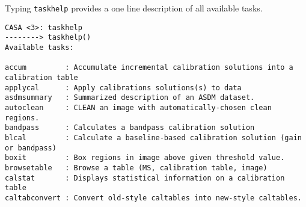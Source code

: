 Typing {\tt taskhelp} provides a one line description of all available
tasks.
\small
\begin{verbatim}
CASA <3>: taskhelp
--------> taskhelp()
Available tasks: 

accum         : Accumulate incremental calibration solutions into a calibration table
applycal      : Apply calibrations solutions(s) to data
asdmsummary   : Summarized description of an ASDM dataset.
autoclean     : CLEAN an image with automatically-chosen clean regions.
bandpass      : Calculates a bandpass calibration solution
blcal         : Calculate a baseline-based calibration solution (gain or bandpass)
boxit         : Box regions in image above given threshold value.
browsetable   : Browse a table (MS, calibration table, image)
calstat       : Displays statistical information on a calibration table
caltabconvert : Convert old-style caltables into new-style caltables.


\end{verbatim}
